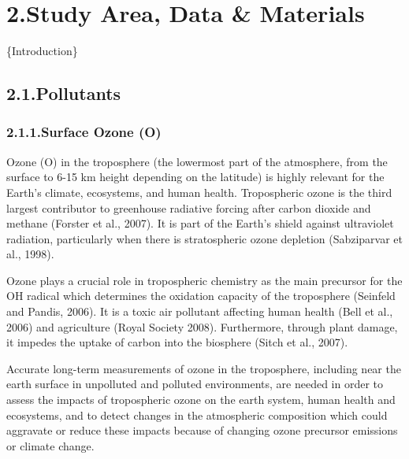 \documentclass[9pt]{report}
\begin{document}
\section{2.\hspace*{0.5em}Study Area, Data \& Materials}\label{sec-study-area-data-materials}%

\noindent{}\{Introduction\}%

\subsection{2.1.\hspace*{0.5em}Pollutants}\label{sec-pollutants}%

\subsubsection{2.1.1.\hspace*{0.5em}Surface Ozone (O)}\label{sec-surface-ozone-o3}%

\noindent{}Ozone (O) in the troposphere (the lowermost part of the atmosphere, from the surface to 6-15 km height depending on the latitude) is highly relevant for the Earth’s climate, ecosystems, and human health.
Tropospheric ozone is the third largest contributor to greenhouse radiative forcing after carbon dioxide and methane (Forster et al., 2007).
It is part of the Earth’s shield against ultraviolet radiation, particularly when there is stratospheric ozone depletion (Sabziparvar et al., 1998).%

Ozone plays a crucial role in tropospheric chemistry as the main precursor for the OH radical which determines the oxidation capacity of the troposphere (Seinfeld and Pandis, 2006). 
It is a toxic air pollutant affecting human health (Bell et al., 2006) and agriculture (Royal Society 2008).
Furthermore, through plant damage, it impedes the uptake of carbon into the biosphere (Sitch et al., 2007).%

Accurate long-term measurements of ozone in the troposphere, including near the earth surface in unpolluted and polluted environments, are needed in order to assess the impacts of tropospheric ozone on the earth system, human health and ecosystems, and to detect changes in the atmospheric composition which could aggravate or reduce these impacts because of changing ozone precursor emissions or climate change.%
\end{document}

